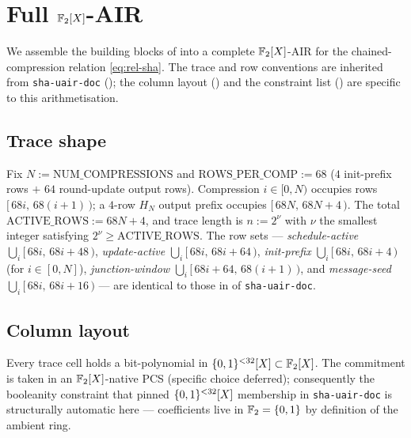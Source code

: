 \section{Full $\mathbb{F}_2[X]$-AIR}\label{sec:uair}

We assemble the building blocks of  into a complete
$\mathbb{F}_2[X]$-AIR for the chained-compression relation
\eqref{eq:rel-sha}. The trace and row conventions are inherited from
\texttt{sha-uair-doc} (); the column layout
() and the constraint list ()
are specific to this arithmetisation.

\subsection{Trace shape}\label{sec:trace-shape}

Fix $N := \mathrm{NUM\_COMPRESSIONS}$ and $\mathrm{ROWS\_PER\_COMP} := 68$
($4$ init-prefix rows $+$ $64$ round-update output rows). Compression
$i \in [0,N)$ occupies rows $[\,68i,\,68(i+1)\,)$; a $4$-row $H_N$
output prefix occupies $[\,68N,\,68N+4\,)$. The total
$\mathrm{ACTIVE\_ROWS} := 68N + 4$, and trace length is
$n := 2^{\nu}$ with $\nu$ the smallest integer satisfying
$2^{\nu} \ge \mathrm{ACTIVE\_ROWS}$. The row sets — \emph{schedule-active}
$\bigcup_i [\,68i,\,68i+48\,)$, \emph{update-active}
$\bigcup_i [\,68i,\,68i+64\,)$, \emph{init-prefix}
$\bigcup_i [\,68i,\,68i+4\,)$ (for $i \in [0,N]$),
\emph{junction-window} $\bigcup_i [\,68i+64,\,68(i{+}1)\,)$, and
\emph{message-seed} $\bigcup_i [\,68i,\,68i+16\,)$ — are identical to
those in  of \texttt{sha-uair-doc}.

\subsection{Column layout}\label{sec:cols}

Every trace cell holds a bit-polynomial in
$\{0,1\}^{<32}[X] \subset \mathbb{F}_2[X]$. The commitment is taken in an
$\mathbb{F}_2[X]$-native PCS (specific choice deferred); consequently
the booleanity constraint that pinned $\{0,1\}^{<32}[X]$ membership in
\texttt{sha-uair-doc} is structurally automatic here — coefficients
live in $\mathbb{F}_2 = \{0,1\}$ by definition of the ambient ring.

